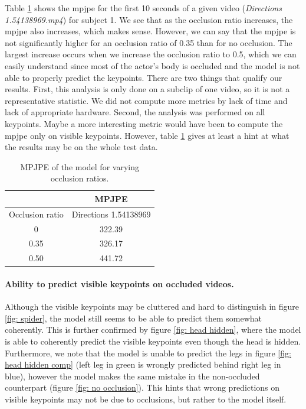 \documentclass[runningheads]{llncs}
\begin{document}
Table \ref{table: mpjpe varying occlusion ratios} shows the \ac{mpjpe} for the first 10 seconds of a given video (\textit{Directions 1.54138969.mp4}) for subject 1. We see that as the occlusion ratio increases, the \ac{mpjpe} also increases, which makes sense. However, we can say that the \ac{mpjpe} is not significantly higher for an occlusion ratio of 0.35 than for no occlusion. The largest increase occurs when we increase the occlusion ratio to 0.5, which we can easily understand since most of the actor's body is occluded and the model is not able to properly predict the keypoints. There are two things that qualify our results. First, this analysis is only done on a subclip of one video, so it is not a representative statistic. We did not compute more metrics by lack of time and lack of appropriate hardware. Second, the analysis was performed on all keypoints. Maybe a more interesting metric would have been to compute the \ac{mpjpe} only on visible keypoints. However, table \ref{table: mpjpe varying occlusion ratios} gives at least a hint at what the results may be on the whole test data.
\begin{table}
  \centering
  \begin{tabular}[t]{|c|c|}
    \hline
                    & MPJPE                 \\ \hline
    Occlusion ratio & Directions 1.54138969 \\ \hline
    0               & 322.39                \\
    0.35            & 326.17                \\
    0.50            & 441.72                \\ \hline
  \end{tabular}
  \caption{MPJPE of the model for varying occlusion ratios.}
  \label{table: mpjpe varying occlusion ratios}
\end{table}
\paragraph{Ability to predict visible keypoints on occluded videos.}
Although the visible keypoints may be cluttered and hard to distinguish in figure \ref{fig: spider}, the model still seems to be able to predict them somewhat coherently. This is further confirmed by figure \ref{fig: head hidden}, where the model is able to coherently predict the visible keypoints even though the head is hidden. Furthermore, we note that the model is unable to predict the legs in figure \ref{fig: head hidden comp} (left leg in green is wrongly predicted behind right leg in blue), however the model makes the same mistake in the non-occluded counterpart (figure \ref{fig: no occlusion}). This hints that wrong predictions on visible keypoints may not be due to occlusions, but rather to the model itself.
\end{document}
